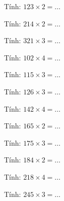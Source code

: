 \begin{ex}
Tính: $123 \times 2 = \dots$
\end{ex}

\begin{ex}
Tính: $214 \times 2 = \dots$
\end{ex}

\begin{ex}
Tính: $321 \times 3 = \dots$
\end{ex}

\begin{ex}
Tính: $102 \times 4 = \dots$
\end{ex}

\begin{ex}
Tính: $115 \times 3 = \dots$
\end{ex}

\begin{ex}
Tính: $126 \times 3 = \dots$
\end{ex}

\begin{ex}
Tính: $142 \times 4 = \dots$
\end{ex}

\begin{ex}
Tính: $165 \times 2 = \dots$
\end{ex}

\begin{ex}
Tính: $175 \times 3 = \dots$
\end{ex}

\begin{ex}
Tính: $184 \times 2 = \dots$
\end{ex}

\begin{ex}
Tính: $218 \times 4 = \dots$
\end{ex}

\begin{ex}
Tính: $245 \times 3 = \dots$
\end{ex}

